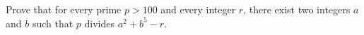 Prove that for every prime 
$p>100$
 and every integer 
$r$, 
 there exist two integers 
$a$
 and 
$b$
 such that 
$p$
 divides 
$a^2+b^5-r$.
